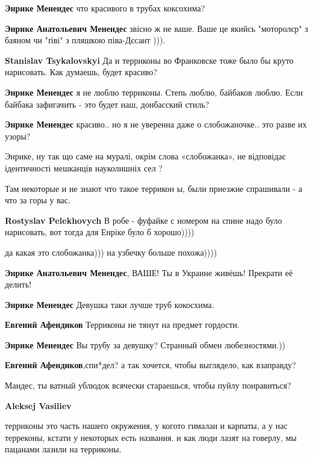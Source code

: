 \begin{itemize}
\begin{itemize}
\textbf{Энрике Менендес} что красивого в трубах коксохима?

\textbf{Энрике Анатольевич Менендес} звісно ж не ваше. Ваше це якийсь "моторолєр" з баяном чи "ґіві" з пляшкою піва-Дєсант ))).


\textbf{Stanislav Tsykalovskyi} Да и терриконы во Франковске тоже было бы круто нарисовать. Как думаешь, будет красиво?

\textbf{Энрике Менендес} я не люблю терриконы.
Степь люблю, байбаков люблю. Если байбака зафигачить - это будет наш, донбасский стиль?

\textbf{Энрике Менендес} красиво.. но я не уверенна даже о слобожаночке.. это разве их узоры?

Энрике, ну так що саме на муралі, окрім слова «слобожанка», не відповідає ідентичності мешканців науколишніх сел ?

Там некоторые и не знают что такое террикон ы, были приезжие спрашивали - а что за горы у вас.

\textbf{Rostyslav Pelekhovych} В робе - фуфайке с номером на спине надо було нарисовать, вот тогда для Енріке було б хорошо))))

да какая это слобожанка))) на узбечку больше похожа))))

\textbf{Энрике Анатольевич Менендес}, ВАШЕ! Ты в Украине живёшь! Прекрати её делить!

\textbf{Энрике Менендес} Девушка таки лучше труб кокосхима.

\textbf{Евгений Афендиков} Терриконы не тянут на предмет гордости.

\textbf{Энрике Менендес} Вы трубу за девушку? Странный обмен любезностями.))

\textbf{Евгений Афендиков},спи*дел? а так хочется, чтобы выглядело, как взаправду?

Мандес, ты ватный ублюдок всячески стараешься, чтобы пуйлу понравиться?

\textbf{Aleksej Vasiliev} 

терриконы это часть нашего окружения, у когото гималаи и карпаты, а у нас
терреконы, кстати у некоторых есть названия. и как люди лазят на говерлу, мы
пацанами лазили на терриконы.



\end{itemize}
\end{itemize}
